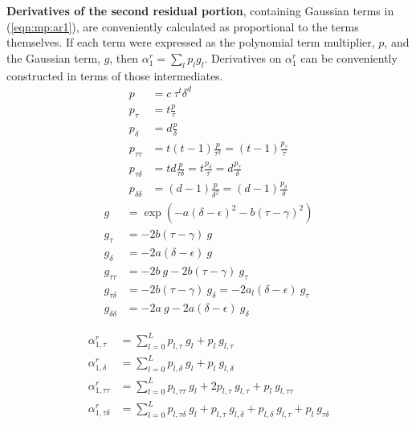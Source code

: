 \textbf{Derivatives of the second residual portion}, containing Gaussian terms in (\ref{eqn:mp:ar1}), are conveniently calculated as proportional to the terms themselves.  If each term were expressed as the polynomial term multiplier, $p$, and the Gaussian term, $g$, then $\alpha^r_1 = \sum_l p_l g_l$.  Derivatives on $\alpha^r_1$ can be conveniently constructed in terms of those intermediates.
\begin{subequations}
\begin{align}
p &= c\ \tau^{t} \delta^{d}\\
p_{\tau} &= t \frac{p}{\tau}\\
p_{\delta} &= d \frac{p}{\delta}\\
p_{\tau\tau} &= t(t-1) \frac{p}{\tau^2} = (t-1) \frac{p_\tau}{\tau}\\
p_{\tau\delta} &= t d \frac{p}{\tau\delta} = t \frac{p_\delta}{\tau} = d \frac{p_\tau}{\delta}\\
p_{\delta\delta} &= (d-1) \frac{p}{\delta^2} = (d-1) \frac{p_\delta}{\delta}
\end{align}
\end{subequations}
\begin{subequations}
\begin{align}
g &= \exp\left( -a(\delta-\epsilon)^2 - b (\tau-\gamma)^2 \right)\\
g_{\tau} &= -2 b (\tau - \gamma)\ g\\
g_{\delta} &= -2 a (\delta - \epsilon)\ g\\
g_{\tau\tau} &= -2 b\ g - 2 b (\tau - \gamma)\ g_{\tau}\\
g_{\tau\delta} &= -2 b (\tau - \gamma)\ g_{\delta} = -2 a_l (\delta - \epsilon)\ g_{\tau}\\
g_{\delta\delta} &= -2 a\ g - 2 a (\delta - \epsilon)\ g_{\delta}
\end{align}
\end{subequations}

\begin{subequations}
\begin{align}
\alpha^r_{1,\tau} &= \sum^L_{l=0} p_{l,\tau}\ g_l + p_l\ g_{l,\tau}\\
\alpha^r_{1,\delta} &= \sum^L_{l=0} p_{l,\delta}\ g_l + p_l\ g_{l,\delta}\\
\alpha^r_{1,\tau\tau} &= \sum^L_{l=0} p_{l,\tau\tau}\ g_l + 2 p_{l,\tau}\ g_{l,\tau} + p_l\ g_{l,\tau\tau}\\
\alpha^r_{1,\tau\delta} &= \sum^L_{l=0} p_{l,\tau\delta}\ g_l + p_{l,\tau}\ g_{l,\delta} + p_{l,\delta}\ g_{l,\tau} + p_l\ g_{\tau\delta}
\end{align}
\end{subequations}

